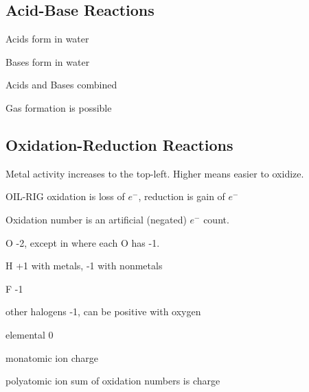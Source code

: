 \begin{mdframed}
\begin{multicols}{2}
\subsection{Acid-Base Reactions}
\begin{compactdesc}
\item[Acids] form  in water
\item[Bases] form  in water
\item[Acids and Bases] combined 
\item[Gas formation] is possible 
\end{compactdesc}

\subsection{Oxidation-Reduction Reactions}
\begin{compactdesc}
\item[Metal activity] increases to the top-left. Higher means easier to
    oxidize.
\item[OIL-RIG] oxidation is loss of $e^-$, reduction is gain of $e^-$
\item[Oxidation number] is an artificial (negated) $e^-$ count.
    \begin{compactdesc}
    \item[O] -2, except in  where each O has -1.
    \item[H] +1 with metals, -1 with nonmetals
    \item[F] -1
    \item[other halogens] -1, can be positive with oxygen
    \item[elemental] 0
    \item[monatomic ion] charge
    \item[polyatomic ion] sum of oxidation numbers is charge
    \end{compactdesc}
\end{compactdesc}
\end{multicols}
\end{mdframed}





